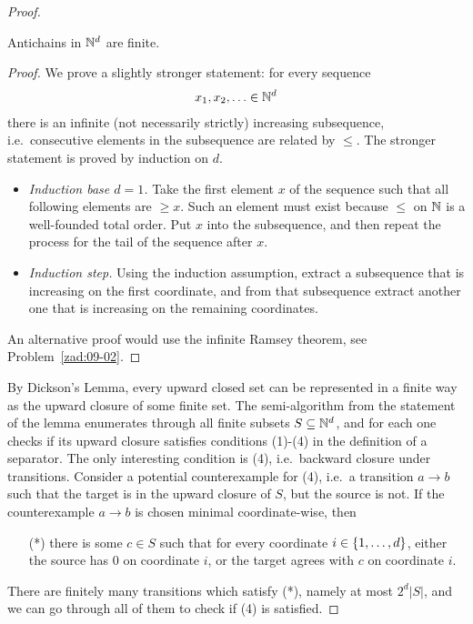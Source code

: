 \begin{proof}
\begin{claim}
	Antichains in $\mathbb{N}^d$ are finite.
\end{claim}
\begin{proof} We prove a slightly stronger statement: for every sequence 
\begin{align*}
  x_1,x_2,\ldots \in \mathbb{N}^d
\end{align*}
there is an infinite (not necessarily strictly) increasing  subsequence, i.e.~consecutive elements in the subsequence are related by $\le$. The stronger statement is proved by induction on $d$. 
\begin{itemize}
	\item \emph{Induction base $d=1$.} Take the first element $x$ of the sequence such that all following elements are $\ge x$.  Such an element must exist because $\le$ on  $\mathbb{N}$ is a well-founded total order. Put $x$ into the subsequence, and then repeat the process for the tail of the sequence after $x$.
	\item  \emph{Induction  step.} Using the induction assumption,  extract a subsequence that is increasing on the first coordinate, and from that subsequence extract another one that is increasing on the remaining coordinates.
\end{itemize}
An alternative proof would use the infinite Ramsey theorem, see Problem~\ref{zad:09-02}.
\end{proof}

By Dickson's Lemma, every upward closed set can be represented in a finite way as the upward closure of some finite set. The semi-algorithm from the statement of the lemma enumerates through all finite subsets $S \subseteq \mathbb{N}^d$, and for each one checks if its upward closure satisfies conditions (1)-(4) in the definition of a separator. The only interesting condition is (4), i.e.~backward closure under transitions. Consider a potential counterexample for (4), i.e.~a transition  $a \to b$ such that the target is in the upward closure of $S$, but the source is not. If the counterexample $a \to b$ is chosen minimal coordinate-wise, then 
\begin{itemize}
\item[(*)] there is some $c \in S$ such that for every coordinate $i \in \{1,\ldots,d\}$, either the source  has $0$ on coordinate $i$, or the target agrees with $c$ on coordinate $i$.
\end{itemize}
There are finitely many transitions which satisfy (*), namely at most $2^d|S|$, and we can go through all of them to check if (4) is satisfied.
\end{proof}
